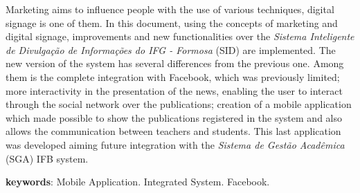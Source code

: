 Marketing aims to influence people with the use of various techniques, digital signage is one of them. In this document, using the concepts of marketing and digital signage,  improvements and new functionalities over the \emph{Sistema Inteligente de Divulgação de Informações do IFG - Formosa} (SID) are implemented. The new version of the system has several differences from the previous one. Among them is the complete integration with Facebook, which was previously limited; more interactivity in the presentation of the news, enabling the user to interact  through the social network over the publications; creation of a mobile application which made possible to show the publications registered in the system and also allows the communication between teachers and students. This last application was developed aiming future integration with the \emph{Sistema de Gestão Acadêmica} (SGA) IFB system.

\vspace{3cm}
\noindent
\textbf{keywords}: Mobile Application. Integrated System. Facebook.